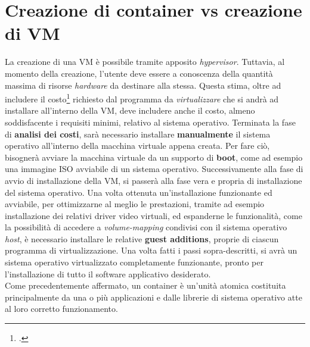 

\section{Creazione di container vs creazione di VM}

La creazione di una VM è possibile tramite apposito \textit{hypervisor}. Tuttavia, al momento della creazione, l'utente deve essere a conoscenza della quantità massima di risorse \textit{hardware} da destinare alla stessa. Questa stima, oltre ad includere il costo\footcite{inteso come quantitativo di risorse fisiche da allocare} richiesto dal programma da \textit{virtualizzare} che si andrà ad installare all'interno della VM, deve includere anche il costo, almeno soddisfacente i requisiti minimi, relativo al sistema operativo. 
Terminata la fase di \textbf{analisi dei costi}, sarà necessario installare \textbf{manualmente} il sistema operativo all'interno della macchina virtuale appena creata. Per fare ciò, bisognerà avviare la macchina virtuale da un supporto di \textbf{boot}, come ad esempio una immagine \gls{ISO} avviabile di un sistema operativo.
Successivamente alla fase di avvio di installazione della VM, si passerà alla fase vera e propria di installazione del sistema operativo.%
Una volta ottenuta un'installazione funzionante ed avviabile, per ottimizzarne al meglio le prestazioni, tramite ad esempio installazione dei relativi \gls{driver} video virtuali, ed espanderne le funzionalità, come la possibilità di accedere a \textit{volume-mapping} condivisi con il sistema operativo \textit{host}, è necessario installare le relative \textbf{\gls{guest additions}}, proprie di ciascun programma di virtualizzazione.
Una volta fatti i passi sopra-descritti, si avrà un sistema operativo virtualizzato completamente funzionante, pronto per l'installazione di tutto il software applicativo desiderato.
\\
Come precedentemente affermato, un container è un'unità atomica costituita principalmente da una o più applicazioni e dalle librerie di sistema operativo atte al loro corretto funzionamento.
